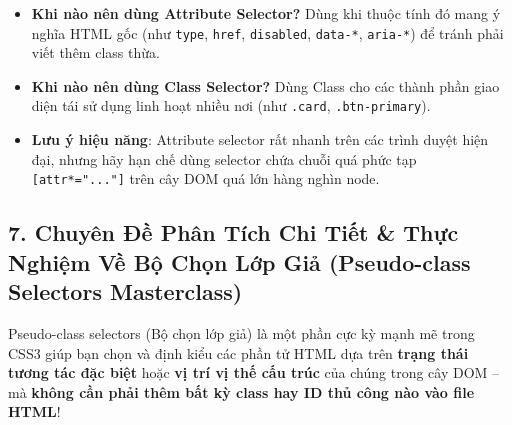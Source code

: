 \documentclass[11pt,oneside]{book}
\newcommand{\codeinline}[1]{\textcolor{accentOrange}{\texttt{#1}}}
\begin{document}
\begin{tipBox}
\begin{itemize}[leftmargin=1.5em, itemsep=3pt, parsep=0pt]
    \item \textbf{Khi nào nên dùng Attribute Selector?} Dùng khi thuộc tính đó mang ý nghĩa HTML gốc (như \codeinline{type}, \codeinline{href}, \codeinline{disabled}, \codeinline{data-*}, \codeinline{aria-*}) để tránh phải viết thêm class thừa.
    \item \textbf{Khi nào nên dùng Class Selector?} Dùng Class cho các thành phần giao diện tái sử dụng linh hoạt nhiều nơi (như \codeinline{.card}, \codeinline{.btn-primary}).
    \item \textbf{Lưu ý hiệu năng}: Attribute selector rất nhanh trên các trình duyệt hiện đại, nhưng hãy hạn chế dùng selector chứa chuỗi quá phức tạp \codeinline{[attr*="..."]} trên cây DOM quá lớn hàng nghìn node.
\end{itemize}
\end{tipBox}

\subsection{7. Chuyên Đề Phân Tích Chi Tiết \& Thực Nghiệm Về Bộ Chọn Lớp Giả (Pseudo-class Selectors Masterclass)}

Pseudo-class selectors (Bộ chọn lớp giả) là một phần cực kỳ mạnh mẽ trong CSS3 giúp bạn chọn và định kiểu các phần tử HTML dựa trên \textbf{trạng thái tương tác đặc biệt} hoặc \textbf{vị trí vị thế cấu trúc} của chúng trong cây DOM -- mà \textbf{không cần phải thêm bất kỳ class hay ID thủ công nào vào file HTML}!
\end{document}
